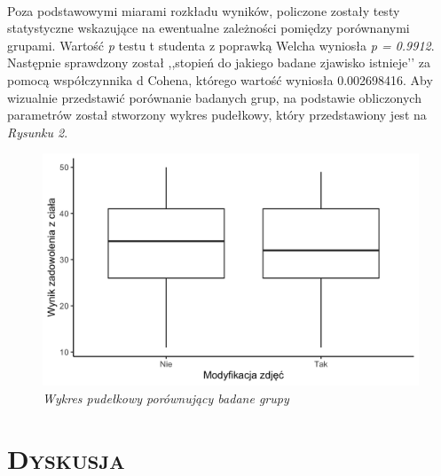 \documentclass[12pt,a4paper,final,oneside,onecolumn,titlepage]{article}
\begin{document}
\paragraph{}
Poza podstawowymi miarami rozkładu wyników, policzone zostały testy statystyczne wskazujące na ewentualne zależności pomiędzy porównanymi grupami. Wartość \textit {p} testu t studenta z poprawką Welcha wyniosła \textit{p = 0.9912}. Następnie sprawdzony został ,,stopień do jakiego badane zjawisko istnieje’’ \citep[s. 5]{cohen_statistical_1977} za pomocą współczynnika d Cohena, którego wartość wyniosła 0.002698416. Aby wizualnie przedstawić porównanie badanych grup, na podstawie obliczonych parametrów został stworzony wykres pudełkowy, który przedstawiony jest na \textit{Rysunku 2}.
\begin{figure}[h!]
\caption{\textit{Wykres pudełkowy porównujący badane grupy}}
\centering
\includegraphics[scale=0.19]{boxwhisk}
\end{figure}
\section*{\large{\textbf{\textsc{Dyskusja}}}}
\newpage

\end{document}
